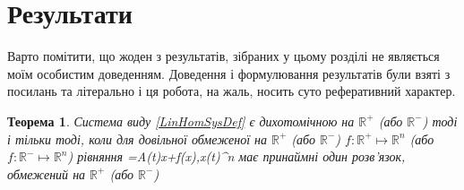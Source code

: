 \documentclass[14pt]{extarticle} %
\newtheorem{theorem}{Теорема}
\begin{document}
\section{Результати}
Варто помітити, що жоден з результатів, зібраних у цьому розділі не являється моїм особистим доведенням. Доведення і формулювання результатів
були взяті з посилань \cite{krein} та \cite{mitrop} літерально і ця робота, на жаль, носить суто реферативний характер.
\begin{theorem}
	Система виду \ref{LinHomSysDef} є дихотомічною на $\mathbb{R}^+$ (або $\mathbb{R}^-$) тоді і тільки тоді, коли для довільної обмеженої на
	$\mathbb{R}^+$ (або $\mathbb{R}^-$) $f:\mathbb{R}^+\mapsto\mathbb{R}^n$ (або $f:\mathbb{R}^-\mapsto\mathbb{R}^n$) рівняння 
	\equation\label{LinHomPerturbedSysDef}=A(t)x+f(x),\;x(t)\in{}^n\endequation
	має принаймні один розв’язок, обмежений на $\mathbb{R}^+$ (або $\mathbb{R}^-$)
\end{theorem}
\end{document}
